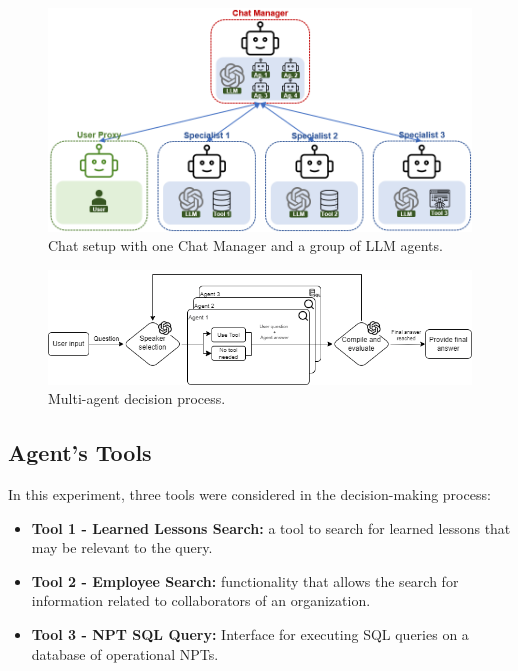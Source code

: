             \begin{figure}[h]
                \centering
                \includegraphics[width=.75\textwidth]{images/agent_config_2.png}
                \caption{Chat setup with one Chat Manager and a group of LLM agents.}
                \label{fig:agent_config_2}
            \end{figure}
            
            \begin{figure}[h]
                \centering
                \includegraphics[width=1\textwidth]{images/agent_diagram_2.png}
                \caption{Multi-agent decision process.}
                \label{fig:diagrama_agente_MultiAgente_2}
            \end{figure}

                

        \subsection{Agent's Tools}
            
            In this experiment, three tools were considered in the decision-making process:

            \begin{itemize}            
                
                \item \textbf{Tool 1 - Learned Lessons Search:} a tool to search for learned lessons that may be relevant to the query. 
                \label{Tool1}
        
                \item \label{Tool2} \textbf{Tool 2 - Employee Search:} functionality that allows the search for information related to collaborators of an organization.
        
                \item \label{Tool3} \textbf{Tool 3 - NPT SQL Query:} Interface for executing SQL queries on a database of operational NPTs.    
                
            \end{itemize}

